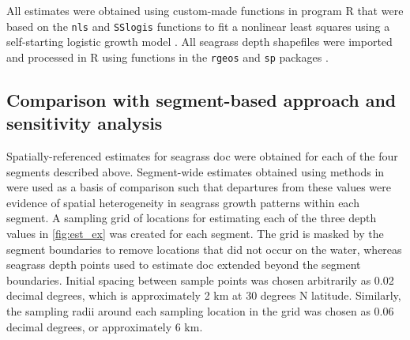 \documentclass[letterpaper,12pt,oneside]{article}\usepackage[]{graphicx}\usepackage[]{color}
\begin{document}
All estimates were obtained using custom-made functions in program R that were based on the \texttt{nls} and \texttt{SSlogis} functions to fit a nonlinear least squares using a self-starting logistic growth model \citep{Bates92,RDCT14}.  All seagrass depth shapefiles were imported and processed in R using functions in the \texttt{rgeos} and \texttt{sp} packages \citep{Bivand08,Bivand14}.  

\subsection{Comparison with segment-based approach and sensitivity analysis}

Spatially-referenced estimates for seagrass \ac{doc} were obtained for each of the four segments described above.  Segment-wide estimates obtained using methods in  were used as a basis of comparison such that departures from these values were evidence of spatial heterogeneity in seagrass growth patterns within each segment.  A sampling grid of locations for estimating each of the three depth values in \cref{fig:est_ex} was created for each segment.  The grid is masked by the segment boundaries to remove locations that did not occur on the water, whereas seagrass depth points used to estimate \ac{doc} extended beyond the segment  boundaries.  Initial spacing between sample points was chosen arbitrarily as 0.02 decimal degrees, which is approximately 2 km at 30 degrees N latitude.  Similarly, the sampling radii around each sampling location in the grid was chosen as 0.06 decimal degrees, or approximately 6 km.  %
\end{document}
